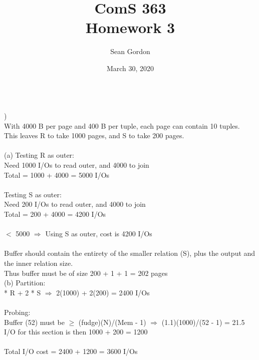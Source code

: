\documentclass[12pt]{article}
\title{ComS 363\\Homework 3}
\author{Sean Gordon}
\date{March 30, 2020}
\begin{document}
\maketitle


\hrulefill \\



)\\
\indent \indent With 4000 B per page and 400 B per tuple, each page can contain 10 tuples.\\
\indent \indent This leaves R to take 1000 pages, and S to take 200 pages.\\\\
\indent (a) Testing R as outer:\\
\indent \indent Need 1000 I/Os to read outer, and 4000 to join\\
\indent \indent Total = 1000 + 4000 = 5000 I/Os\\\\
\indent \indent Testing S as outer:\\
\indent \indent Need 200 I/Os to read outer, and 4000 to join\\
\indent \indent Total = 200 + 4000 = 4200 I/Os\\\\
\indent {} $<$ 5000 $\Rightarrow$ Using S as outer, cost is 4200 I/Os\\\\
\indent \indent Buffer should contain the entirety of the smaller relation (S), plus the output and \\
\indent \indent the inner relation size.\\
\indent \indent Thus buffer must be of size 200 + 1 + 1 = 202 pages\\


\indent (b) Partition:\\
\indent {} * R + 2 * S $\Rightarrow$ 2(1000) + 2(200) = 2400 I/Os\\\\
\indent \indent Probing:\\
\indent \indent Buffer (52) must be $\ge$ (fudge)(N)/(Mem - 1) $\Rightarrow$ (1.1)(1000)/(52 - 1) = 21.5 \checkmark \\
\indent \indent I/O for this section is then 1000 + 200 = 1200\\\\
\indent \indent Total I/O cost = 2400 + 1200 = 3600 I/Os\\

\pagebreak
\end{document}
